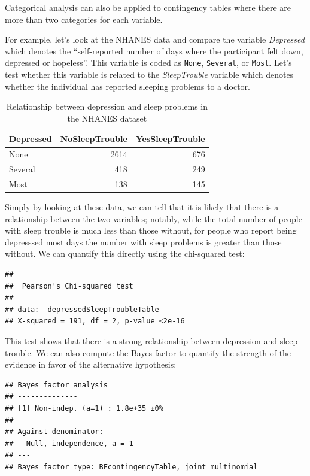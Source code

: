 \documentclass[12pt,]{book}
\theoremstyle{definition}
\theoremstyle{definition}
\theoremstyle{definition}
\theoremstyle{remark}
\begin{document}
Categorical analysis can also be applied to contingency tables where there are more than two categories for each variable.

For example, let's look at the NHANES data and compare the variable \emph{Depressed} which denotes the ``self-reported number of days where the participant felt down, depressed or hopeless''. This variable is coded as \texttt{None}, \texttt{Several}, or \texttt{Most}. Let's test whether this variable is related to the \emph{SleepTrouble} variable which denotes whether the individual has reported sleeping problems to a doctor.

\begin{table}

\caption{\label{tab:unnamed-chunk-87}Relationship between depression and sleep problems in the NHANES dataset}
\centering
\begin{tabular}[t]{l|r|r}
\hline
Depressed & NoSleepTrouble & YesSleepTrouble\\
\hline
None & 2614 & 676\\
\hline
Several & 418 & 249\\
\hline
Most & 138 & 145\\
\hline
\end{tabular}
\end{table}

Simply by looking at these data, we can tell that it is likely that there is a relationship between the two variables; notably, while the total number of people with sleep trouble is much less than those without, for people who report being depresssed most days the number with sleep problems is greater than those without. We can quantify this directly using the chi-squared test:

\begin{verbatim}
## 
##  Pearson's Chi-squared test
## 
## data:  depressedSleepTroubleTable
## X-squared = 191, df = 2, p-value <2e-16
\end{verbatim}

This test shows that there is a strong relationship between depression and sleep trouble. We can also compute the Bayes factor to quantify the strength of the evidence in favor of the alternative hypothesis:

\begin{verbatim}
## Bayes factor analysis
## --------------
## [1] Non-indep. (a=1) : 1.8e+35 ±0%
## 
## Against denominator:
##   Null, independence, a = 1 
## ---
## Bayes factor type: BFcontingencyTable, joint multinomial
\end{verbatim}
\end{document}
